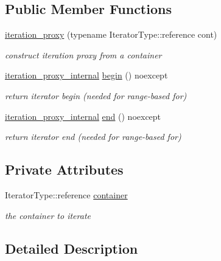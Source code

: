 \subsection*{Public Member Functions}
\begin{DoxyCompactItemize}
\item 
\hyperlink{classnlohmann_1_1basic__json_1_1iteration__proxy_a25bf4984cce730759082b6f5c483e0dc}{iteration\+\_\+proxy} (typename Iterator\+Type\+::reference cont)
\begin{DoxyCompactList}\small\item\em construct iteration proxy from a container \end{DoxyCompactList}\item 
\hyperlink{classnlohmann_1_1basic__json_1_1iteration__proxy_1_1iteration__proxy__internal}{iteration\+\_\+proxy\+\_\+internal} \hyperlink{classnlohmann_1_1basic__json_1_1iteration__proxy_af4d6eb84a5e74c15fd1d47091429b50e}{begin} () noexcept
\begin{DoxyCompactList}\small\item\em return iterator begin (needed for range-\/based for) \end{DoxyCompactList}\item 
\hyperlink{classnlohmann_1_1basic__json_1_1iteration__proxy_1_1iteration__proxy__internal}{iteration\+\_\+proxy\+\_\+internal} \hyperlink{classnlohmann_1_1basic__json_1_1iteration__proxy_afc4cfc693059a127c288fa6175d44cf0}{end} () noexcept
\begin{DoxyCompactList}\small\item\em return iterator end (needed for range-\/based for) \end{DoxyCompactList}\end{DoxyCompactItemize}
\subsection*{Private Attributes}
\begin{DoxyCompactItemize}
\item 
Iterator\+Type\+::reference \hyperlink{classnlohmann_1_1basic__json_1_1iteration__proxy_a07048776258c709360bc0e46e261ee64}{container}
\begin{DoxyCompactList}\small\item\em the container to iterate \end{DoxyCompactList}\end{DoxyCompactItemize}


\subsection{Detailed Description}
